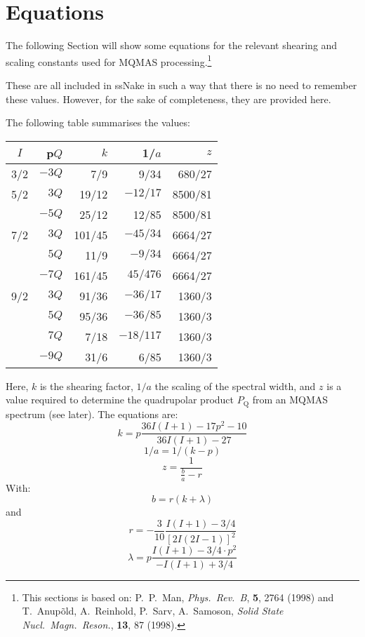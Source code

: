 \documentclass[11pt,a4paper]{article}
\begin{document}
\section{Equations}
The following Section will show some equations for the relevant shearing and scaling constants used
for MQMAS processing.\footnote{This sections is based on:
  P.\ P.\ Man, \textit{Phys.\ Rev.\ B}, \textbf{5}, 2764 (1998) and 
  T.\ Anup\~{o}ld, A.\ Reinhold, P.\ Sarv, A.\ Samoson, \textit{Solid State Nucl.\ Magn.\ Reson.},
  \textbf{13}, 87 (1998).}

These are all included in ssNake in such a way that there is no need to remember these values.
However, for the sake of completeness, they are provided here.

The following table summarises the values:
\begin{center}
\begin{tabular}[h]{c r r r r}
  \toprule
  $I$ & p$Q$ & $k$ & 1/$a$ & $z$\\
  \midrule
  3/2 & $-3Q$ & 7/9 & 9/34 & 680/27\\
  5/2 & $3Q$ & 19/12 & $-12/17$& 8500/81\\
   & $-5Q$ & 25/12 &12/85& 8500/81 \\
  7/2 & $3Q$ & 101/45 & $-45/34$& 6664/27 \\
   & $5Q$ & 11/9 & $-9/34$ & 6664/27\\
   & $-7Q$ & 161/45 & $45/476$ & 6664/27\\
  9/2 & $3Q$ & 91/36 &  $-36/17$ & 1360/3 \\
   & $5Q$ & 95/36 & $-36/85$ & 1360/3 \\
	& $7Q$ & 7/18 & $-18/117$ & 1360/3 \\
	& $-9Q$ & 31/6 & 6/85 & 1360/3 \\
  \bottomrule
\end{tabular}
\end{center}
Here, $k$ is the shearing factor, $1/a$ the scaling of the spectral width, and $z$ is a value required to determine the quadrupolar product $P_\text{Q}$ from an MQMAS spectrum (see later).
The equations are:
\begin{equation}
  k = p \frac{36I(I+1)-17p^2 - 10}{36I(I+1) - 27}
\end{equation}
\begin{equation}
  1/a = 1/(k - p)
\end{equation}
  \begin{equation}
	 z = \frac{1}{\frac{b}{a}-r}
  \end{equation}
  With:
 \begin{equation}
	b = r	(k + \lambda)
 \end{equation}
 and
 \begin{equation}
	r = -\frac{3}{10}\frac{I(I+1)-3/4}{[2I(2I-1)]^2}
 \end{equation}
 \begin{equation}
	\lambda = p \frac{I(I+1)-3/4 \cdot p^2}{-I(I+1)+3/4}
 \end{equation}
\end{document}
